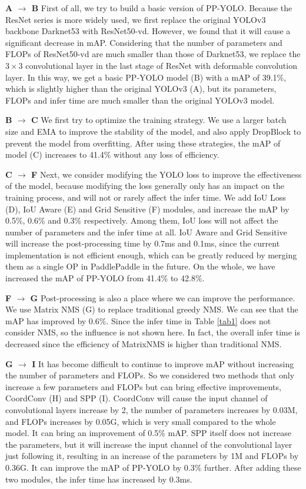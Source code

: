 \documentclass[10pt,twocolumn,letterpaper]{article}
\newcommand{\pheadB}[1] {\vspace{1mm}\noindent\textbf{#1}}
\begin{document}
	\pheadB{A $\rightarrow$ B} 
	First of all, we try to build a basic version of PP-YOLO. Because the ResNet\cite{resnet} series is more widely used, we first replace the original YOLOv3 backbone Darknet53 with ResNet50-vd. However, we found that it will cause a significant decrease in mAP. Considering that the number of parameters and FLOPs of ResNet50-vd are much smaller than those of Darknet53, we replace the $3\times3$ convolutional layer in the last stage of ResNet with deformable convolution layer\cite{dcn}. In this way, we get a basic PP-YOLO model (B) with a mAP of 39.1\%, which is slightly higher than the original YOLOv3 (A), but its parameters, FLOPs and infer time are much smaller than the original YOLOv3 model.
	
	\pheadB{B $\rightarrow$ C} 
	We first try to optimize the training strategy. We use a larger batch size and EMA to improve the stability of the model, and also apply DropBlock to prevent the model from overfitting. After using these strategies, the mAP of model (C) increases to 41.4\% without any loss of efficiency.
	
	\pheadB{C $\rightarrow$ F} 
	Next, we consider modifying the YOLO loss to improve the effectiveness of the model, because modifying the loss generally only has an impact on the training process, and will not or rarely affect the infer time.
	We add IoU Loss (D), IoU Aware (E) and Grid Sensitive (F) modules, and increase the mAP by 0.5\%, 0.6\% and 0.3\% respectively. Among them, IoU loss will not affect the number of parameters and the infer time at all. IoU Aware and Grid Sensitive will increase the post-processing time by 0.7ms and 0.1ms, since the current implementation is not efficient enough, which can be greatly reduced by merging them as a single OP in PaddlePaddle in the future. On the whole, we have increased the mAP of PP-YOLO from 41.4\% to 42.8\%.
	
	\pheadB{F $\rightarrow$ G} 
	Post-processing is also a place where we can improve the performance. We use Matrix NMS (G) to replace traditional greedy NMS. We can see that the mAP has improved by 0.6\%. Since the infer time in Table \ref{tab1} does not consider NMS, so the influence is not shown here. In fact, the overall infer time is decreased since the efficiency of MatrixNMS is higher than traditional NMS.
	
	\pheadB{G $\rightarrow$ I} 
	It has become difficult to continue to improve mAP without increasing the number of parameters and FLOPs. So we considered two methods that only increase a few parameters and FLOPs but can bring effective improvements, CoordConv (H) and SPP (I).
	CoordConv will cause the input channel of convolutional layers increase by 2, the number of parameters increases by 0.03M, and FLOPs increases by 0.05G, which is very small compared to the whole model. It can bring an improvement of 0.5\% mAP. 
	SPP itself does not increase the parameters, but it will increase the input channel of the convolutional layer just following it, resulting in an increase of the parameters by 1M and FLOPs by 0.36G. It can improve the mAP of PP-YOLO by 0.3\% further. After adding these two modules, the infer time has increased by 0.3ms.
	
\end{document}
